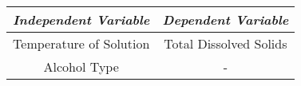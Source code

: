 

\begin{table}[H]
    \centering
        \begin{tabular}{|c|c|}
        \hline
        \hline
        \textit{Independent Variable} & \textit{Dependent Variable} \\
        \hline
        \hline
        {Temperature of Solution} & {Total Dissolved Solids} \\
        \hline
        {Alcohol Type} & {-} \\
        \hline
        \hline
        \end{tabular}
\end{table}


